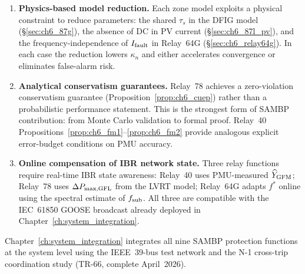 \begin{enumerate}
  \item \textbf{Physics-based model reduction.}  Each zone model exploits a
    physical constraint to reduce parameters: the shared $\tau_s$ in the
    DFIG model (§\ref{sec:ch6_87g}), the absence of DC in PV current
    (§\ref{sec:ch6_87l_pv}), and the frequency-independence of $I_{\rm fault}$
    in Relay~64G (§\ref{sec:ch6_relay64g}).  In each case the reduction lowers
    $\kappa_n$ and either accelerates convergence or eliminates false-alarm risk.

  \item \textbf{Analytical conservatism guarantees.}  Relay~78 achieves a
    zero-violation conservatism guarantee (Proposition~\ref{prop:ch6_cuep})
    rather than a probabilistic performance statement.  This is the strongest
    form of SAMBP contribution: from Monte Carlo validation to formal proof.
    Relay~40 Propositions~\ref{prop:ch6_fm1}--\ref{prop:ch6_fm2} provide
    analogous explicit error-budget conditions on PMU accuracy.

  \item \textbf{Online compensation of IBR network state.}  Three relay
    functions require real-time IBR state awareness: Relay~40 uses PMU-measured
    $\widehat{Y}_{\rm GFM}$; Relay~78 uses $\Delta P_{\rm max,GFL}$ from the
    LVRT model; Relay~64G adapts $f^*$ online using the spectral estimate of
    $f_{\rm sub}$.  All three are compatible with the IEC~61850 GOOSE
    broadcast already deployed in Chapter~\ref{ch:system_integration}.
\end{enumerate}

Chapter~\ref{ch:system_integration} integrates all nine SAMBP protection
functions at the system level using the IEEE~39-bus test network and the
N-1 cross-trip coordination study (TR-66, complete April~2026).

